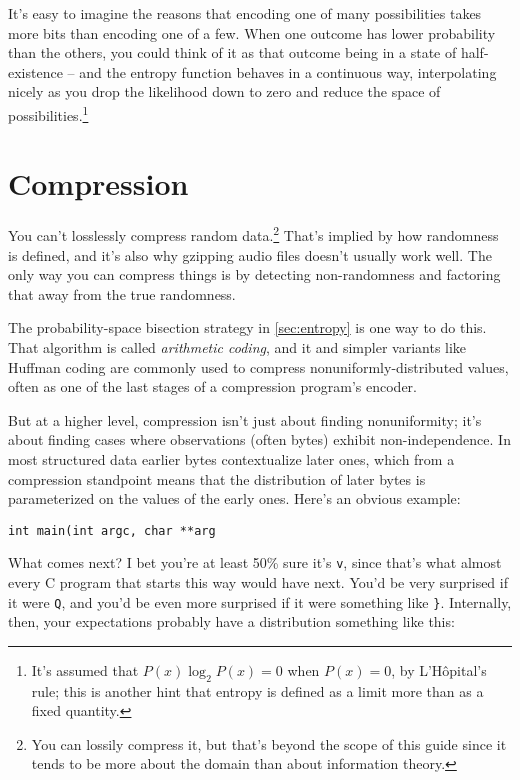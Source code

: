 \documentclass{article}
\begin{document}
    It's easy to imagine the reasons that encoding one of many possibilities
    takes more bits than encoding one of a few. When one outcome has lower
    probability than the others, you could think of it as that outcome being in
    a state of half-existence -- and the entropy function behaves in a
    continuous way, interpolating nicely as you drop the likelihood down to
    zero and reduce the space of possibilities.\footnote{It's assumed that
    $P(x) \log_2 P(x) = 0$ when $P(x) = 0$, by L'H\^opital's rule; this is
    another hint that entropy is defined as a limit more than as a fixed
    quantity.}

\section{Compression}\label{sec:compression}
  You can't losslessly compress random data.\footnote{You can lossily compress
  it, but that's beyond the scope of this guide since it tends to be more about
  the domain than about information theory.} That's implied by how randomness
  is defined, and it's also why gzipping audio files doesn't usually work well.
  The only way you can compress things is by detecting non-randomness and
  factoring that away from the true randomness.

  The probability-space bisection strategy in \ref{sec:entropy} is one way to
  do this. That algorithm is called {\em arithmetic coding}, and it and simpler
  variants like Huffman coding are commonly used to compress
  nonuniformly-distributed values, often as one of the last stages of a
  compression program's encoder.

  But at a higher level, compression isn't just about finding nonuniformity;
  it's about finding cases where observations (often bytes) exhibit
  non-independence. In most structured data earlier bytes contextualize later
  ones, which from a compression standpoint means that the distribution of
  later bytes is parameterized on the values of the early ones. Here's an
  obvious example:

\begin{verbatim}
int main(int argc, char **arg
\end{verbatim}

  What comes next? I bet you're at least 50\% sure it's {\tt v}, since that's
  what almost every C program that starts this way would have next. You'd be
  very surprised if it were {\tt Q}, and you'd be even more surprised if it
  were something like \verb|}|. Internally, then, your expectations probably
  have a distribution something like this:
\end{document}
